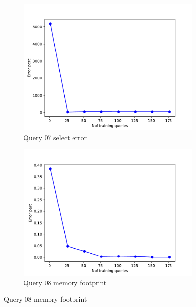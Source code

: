 \begin{figure}[!htb]
     \begin{subfigure}[t]{0.5\textwidth}
       \includegraphics[scale=0.4]{figs/tpch10/tpch10_sel07_error.pdf}
       \caption{Query 07 select error}
       \label{fig:tpch_sel07}
     \end{subfigure}
     \begin{subfigure}[t]{0.5\textwidth}
       \includegraphics[scale=0.4]{figs/tpch10/tpch10_sel08_error.pdf}
       \caption{Query 08 memory footprint}
       \label{fig:tpch_sel08}
      \end{subfigure}
\end{figure}

